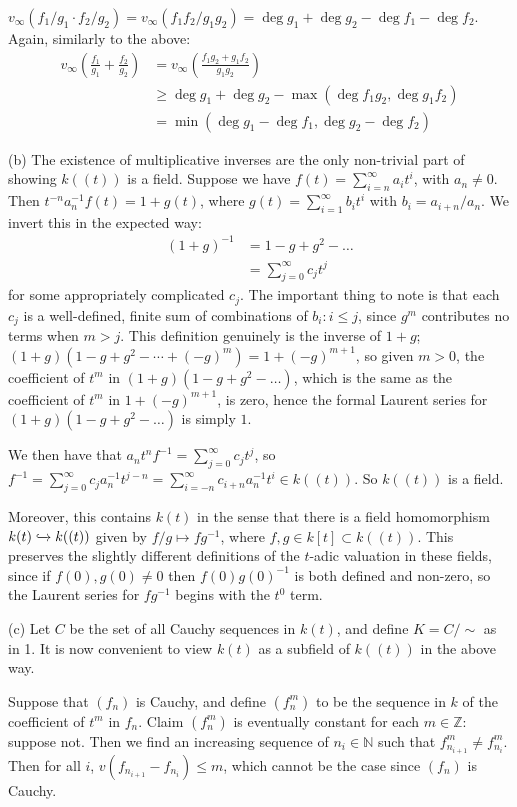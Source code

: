 \documentclass[]{article}
\theoremstyle{custhm}
\theoremstyle{cusdef}
\theoremstyle{custhm}
\theoremstyle{custhm}
\theoremstyle{custhm}
\theoremstyle{custhm}
\theoremstyle{cusdef}
\theoremstyle{remark}
\newcommand{\N}{\mathbb{N}}
\newcommand{\Z}{\mathbb{Z}}
\begin{document}
$v_\infty(f_1/g_1 \cdot f_2/g_2) =v_\infty(f_1f_2/g_1g_2) = \deg g_1 + \deg g_2 - \deg f_1 - \deg f_2$. Again, similarly to the above:
\begin{align*}
v_\infty\left(\frac{f_1}{g_1}+\frac{f_2}{g_2}\right) &= v_\infty \left(\frac{f_1g_2 + g_1f_2}{g_1g_2}\right)\\
&\ge \deg g_1 + \deg g_2 - \max(\deg f_1g_2,\deg g_1f_2)\\
&=\min(\deg g_1 - \deg f_1, \deg g_2 - \deg f_2)
\end{align*}

(b) The existence of multiplicative inverses are the only non-trivial part of showing $k((t))$ is a field. Suppose we have $f(t) = \sum_{i=n}^{\infty}a_it^i$, with $a_n\ne 0$. Then $t^{-n}a_n^{-1}f(t) = 1 + g(t)$, where $g(t) = \sum_{i=1}^{\infty}b_it^i$ with $b_i = a_{i+n}/a_n$. We invert this in the expected way:
\begin{align*}
	(1+g)^{-1} &= 1 - g + g^2 - \dots\\
	&= \sum_{j=0}^{\infty}c_jt^j
\end{align*}
for some appropriately complicated $c_j$. The important thing to note is that each $c_j$ is a well-defined, finite sum of combinations of $b_i: i \le j$, since $g^m$ contributes no terms when $m > j$. This definition genuinely is the inverse of $1+g$; $(1+g)(1-g+g^2-\cdots+(-g)^m)=1+(-g)^{m+1}$, so given $m > 0$, the coefficient of $t^m$ in $(1+g)(1-g+g^2-\dots)$, which is the same as the coefficient of $t^m$ in $1+(-g)^{m+1}$, is zero, hence the formal Laurent series for $(1+g)(1-g+g^2-\dots)$ is simply $1$.

We then have that $a_nt^nf^{-1} = \sum_{j=0}^{\infty}c_jt^{j}$, so $f^{-1}=\sum_{j=0}^{\infty}c_ja_n^{-1}t^{j-n} = \sum_{i=-n}^{\infty}c_{i+n}a_n^{-1}t^i\in k((t))$. So $k((t))$ is a field.

Moreover, this contains $k(t)$ in the sense that there is a field homomorphism $k(t)\xhookrightarrow{} k((t))$ given by $f/g\mapsto fg^{-1}$, where $f,g\in k[t]\subset k((t))$. This preserves the slightly different definitions of the $t$-adic valuation in these fields, since if $f(0),g(0)\ne 0$ then $f(0)g(0)^{-1}$ is both defined and non-zero, so the Laurent series for $fg^{-1}$ begins with the $t^0$ term.

(c) Let $C$ be the set of all Cauchy sequences in $k(t)$, and define $K = C/\sim$ as in 1. It is now convenient to view $k(t)$ as a subfield of $k((t))$ in the above way.

Suppose that $(f_n)$ is Cauchy, and define $(f_n^m)$ to be the sequence in $k$ of the coefficient of $t^m$ in $f_n$. Claim $(f_n^m)$ is eventually constant for each $m\in \Z$: suppose not. Then we find an increasing sequence of $n_i\in \N$ such that $f_{n_{i+1}}^m\ne f_{n_i}^m$. Then for all $i$, $v(f_{n_{i+1}} - f_{n_i})\le m$, which cannot be the case since $(f_n)$ is Cauchy.
\end{document}
